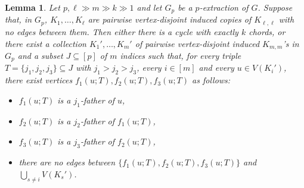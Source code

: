 \documentclass[11pt,english]{article}
\theoremstyle{plain}
\newtheorem{lem}[thm]{Lemma}
\theoremstyle{definition}
\theoremstyle{remark}
\begin{document}
        \begin{lem} \label{lem:cleaning-step-one}
            Let $p, \ell \gg m \gg k \gg 1$ and let $G_p$ be a $p$-extraction of $G$. %
            Suppose that, in $G_p$, $K_1, \ldots, K_{\ell}$ are pairwise vertex-disjoint induced copies of $K_{\ell, \ell}$ with no edges between them. Then either there is a cycle with exactly $k$ chords, or there exist a collection $K_1', \ldots, K_m'$ of pairwise vertex-disjoint induced $K_{m, m}$'s in $G_p$ and a subset $J \subseteq [p]$ of $m$ indices such that, for every triple $T=\{j_1, j_2, j_3\} \subseteq J$ with $j_1 > j_2 > j_3$, every $i \in [m]$ and every $u \in V(K_i')$, there exist vertices $f_{1}(u;T), f_{2}(u;T), f_{3}(u;T)$ as follows:
            \begin{itemize}
                \item $f_{1}(u;T)$ is a $j_1$-father of $u$, 
                \item $f_{2}(u;T)$ is a $j_2$-father of $f_{1}(u;T)$,
                \item $f_{3}(u;T)$ is a $j_3$-father of $f_{2}(u;T)$,
                \item there are no edges between $\{f_{1}(u;T),f_{2}(u;T),f_{3}(u;T)\}$ and $\bigcup_{s \neq i}V(K_{s}')$. 
            \end{itemize}
        \end{lem}
        
\end{document}
